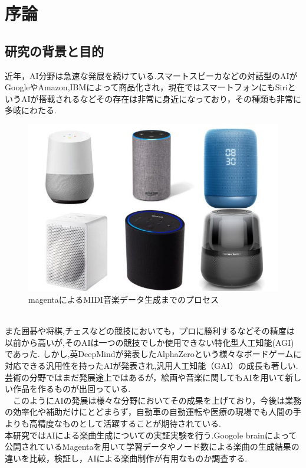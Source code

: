 
	\chapter{序論}
    \section{研究の背景と目的}
    近年，AI分野は急速な発展を続けている.スマートスピーカなどの対話型のAIがGoogleやAmazon,IBMによって商品化され，現在ではスマートフォンにもSiriというAIが搭載されるなどその存在は非常に身近になっており，その種類も非常に多岐にわたる.
    \begin{figure}[h]
        \begin{screen}
        \begin{center}
            \includegraphics[scale=0.5, clip]{./img/smartspeaker_list.jpg}
            \caption{magentaによるMIDI音楽データ生成までのプロセス}
            \label{fig:magentaによるMIDI音楽データ生成までのプロセス}
        \end{center}
        \end{screen}
    \end{figure}\\
    また囲碁や将棋,チェスなどの競技においても，プロに勝利するなどその精度は以前から高いが,そのAIは一つの競技でしか使用できない特化型人工知能(AGI)であった.
    しかし,英DeepMindが発表したAlphaZeroという様々なボードゲームに対応できる汎用性を持ったAIが発表され,汎用人工知能（GAI）の成長も著しい.芸術の分野ではまだ発展途上ではあるが，絵画や音楽に関してもAIを用いて新しい作品を作るものが出回っている.\\
    　このようにAIの発展は様々な分野においてその成果を上げており，今後は業務の効率化や補助だけにとどまらず，自動車の自動運転や医療の現場でも人間の手よりも高精度なものとして活躍することが期待されている.\\
    本研究ではAIによる楽曲生成についての実証実験を行う.Googole brainによって公開されているMagentaを用いて学習データやノード数による楽曲の生成結果の違いを比較，検証し，AIによる楽曲制作が有用なものか調査する.\\

